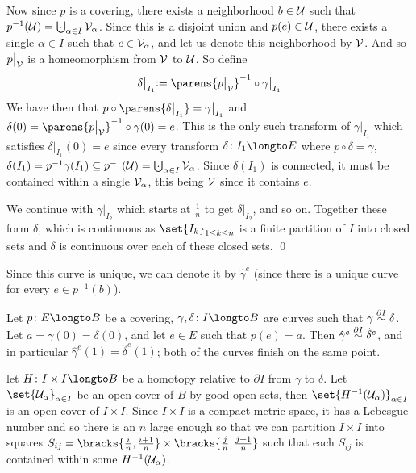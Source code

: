 Now since $p$ is a covering, there exists a neighborhood $b\in{\cal U}$ such that $p^{-1}({\cal U})=\bigdcup_{\alpha\in I}{\cal V}_\alpha$.
Since this is a disjoint union and $p(e)\in{\cal U}$, there exists a single $\alpha\in I$ such that $e\in{\cal V}_\alpha$, and let us denote this neighborhood by ${\cal V}$.
And so $p\bigl|_{\cal V}$ is a homeomorphism from ${\cal V}$ to ${\cal U}$.
So define
$$ \delta\bigl|_{I_1}\coloneqq \parens{p\bigl|_{\cal V}}^{-1}\circ\gamma\bigl|_{I_1} $$
We have then that $p\circ\parens{\delta\bigl|_{I_1}}=\gamma\bigl|_{I_1}$ and $\delta(0)=\parens{p\bigl|_{\cal V}}^{-1}\circ\gamma(0)=e$.
This is the only such transform of $\gamma\bigl|_{I_1}$ which satisfies $\delta\bigl|_{I_1}(0)=e$ since every transform $\delta\colon I_1\longto E$ where $p\circ\delta=\gamma$,
$\delta(I_1)=p^{-1}\gamma(I_1)\subseteq p^{-1}({\cal U})=\bigdcup_{\alpha\in I}{\cal V}_\alpha$.
Since $\delta(I_1)$ is connected, it must be contained within a single ${\cal V}_\alpha$, this being ${\cal V}$ since it contains $e$.

We continue with $\gamma\bigl|_{I_2}$ which starts at $\frac1n$ to get $\delta\bigl|_{I_2}$, and so on.
Together these form $\delta$, which is continuous as $\set{I_k}_{1\leq k\leq n}$ is a finite partition of $I$ into closed sets and $\delta$ is continuous over each of these closed sets.
\qed

Since this curve is unique, we can denote it by $\hat\gamma^e$ (since there is a unique curve for every $e\in p^{-1}(b)$).

\bprop

    Let $p\colon E\longto B$ be a covering, $\gamma,\delta\colon I\longto B$ are curves such that $\gamma\hdi\delta$.
    Let $a=\gamma(0)=\delta(0)$, and let $e\in E$ such that $p(e)=a$.
    Then $\hat\gamma^e\hdi\hat\delta^e$, and in particular $\hat\gamma^e(1)=\hat\delta^e(1)$; both of the curves finish on the same point.

\eprop

\Proof let $H\colon I\times I\longto B$ be a homotopy relative to $\partial I$ from $\gamma$ to $\delta$.
Let $\set{\U_\alpha}_{\alpha\in I}$ be an open cover of $B$ by good open sets, then $\set{H^{-1}(\U_\alpha)}_{\alpha\in I}$ is an open cover of $I\times I$.
Since $I\times I$ is a compact metric space, it has a Lebesgue number and so there is an $n$ large enough so that we can partition $I\times I$ into squares
$S_{ij}=\bracks{\frac in,\frac{i+1}n}\times\bracks{\frac jn,\frac{j+1}n}$ such that each $S_{ij}$ is contained within some $H^{-1}({\cal U}_\alpha)$.

